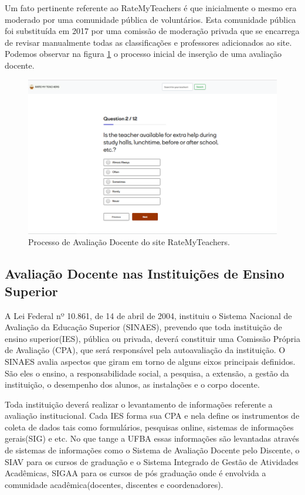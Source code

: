 \documentclass[12pt, a4paper]{report}
\begin{document}
Um fato pertinente referente ao RateMyTeachers é que inicialmente o mesmo era moderado por uma comunidade pública de voluntários. Esta comunidade pública foi substituída em 2017 por uma comissão de moderação privada que se encarrega de revisar manualmente todas as classificações e professores adicionados ao site. Podemos observar na figura \ref{fig:ratemyteacher} o processo inicial de inserção de uma avaliação docente.

\begin{figure}
\centering
\includegraphics[scale=0.45]{ratemyteachers.png}
\caption{Processo de Avaliação Docente do site RateMyTeachers.}
\label{fig:ratemyteacher}
\end{figure}

\subsection{Avaliação Docente nas Instituições de Ensino Superior}

 A Lei Federal nº 10.861, de 14 de abril de 2004, instituiu o Sistema Nacional de Avaliação da Educação Superior (SINAES), prevendo que toda instituição de ensino superior(IES), pública ou privada, deverá constituir uma Comissão Própria de Avaliação (CPA), que será responsável pela autoavaliação da instituição. O SINAES avalia aspectos que giram em torno de alguns eixos principais definidos. São eles o ensino, a responsabilidade social, a pesquisa, a extensão, a gestão da instituição, o desempenho dos alunos, as instalações e o corpo docente.
 
 Toda instituição deverá realizar o levantamento de informações referente a avaliação institucional. Cada IES forma sua CPA e nela define os instrumentos de coleta de dados tais como formulários, pesquisas online, sistemas de informações gerais(SIG) e etc. No que tange a UFBA essas informações são levantadas através de sistemas de informações como o Sistema de Avaliação Docente pelo Discente, o SIAV para os cursos de graduação e o Sistema Integrado de Gestão de Atividades Acadêmicas, SIGAA para os cursos de pós graduação onde é envolvida a comunidade acadêmica(docentes, discentes e coordenadores).
 
\end{document}
